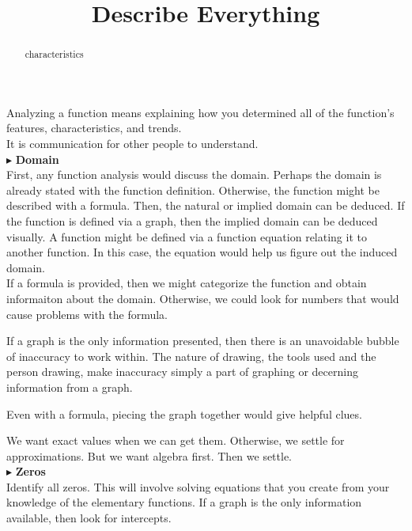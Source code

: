 \documentclass{ximera}
\title{Describe Everything}
\begin{document}
\begin{abstract}
characteristics
\end{abstract}
\maketitle




Analyzing a function means explaining how you determined all of the function's features, characteristics, and trends. \\

It is communication for other people to understand. \\






$\blacktriangleright$ \textbf{\textcolor{red!10!blue!90!}{Domain}}   \\
First, any function analysis would discuss the domain.  Perhaps the domain is already stated with the function definition. Otherwise, the function might be described with a formula. Then, the natural or implied domain can be deduced.  If the function is defined via a graph, then the implied domain can be deduced visually. A function might be defined via a function equation relating it to another function.  In this case, the equation would help us figure out the induced domain.\\

If a formula is provided, then we might categorize the function and obtain informaiton about the domain.  Otherwise, we could look for numbers that would cause problems with the formula.

If a graph is the only information presented, then there is an unavoidable bubble of inaccuracy to work within.  The nature of drawing, the tools used and the person drawing, make inaccuracy simply a part of graphing or decerning information from a graph.

Even with a formula, piecing the graph together would give helpful clues. 

We want exact values when we can get them.  Otherwise, we settle for approximations. But we want algebra first.  Then we settle.\\









$\blacktriangleright$ \textbf{\textcolor{red!10!blue!90!}{Zeros}} \\
Identify all zeros.  This will involve solving equations that you create from your knowledge of the elementary functions. If a graph is the only information available, then look for intercepts.\\
\end{document}
